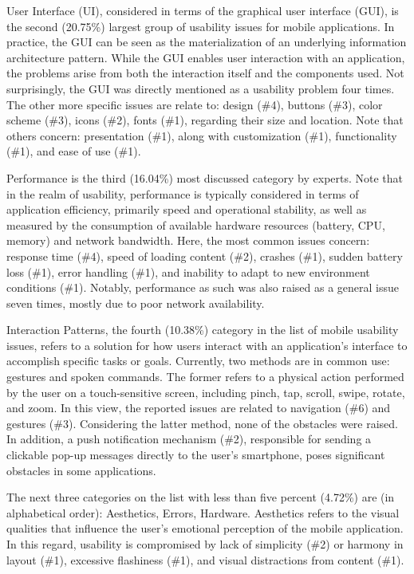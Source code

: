 \documentclass[preprint,12pt,number]{elsarticle}
\begin{document}
User Interface (UI), considered in terms of the graphical user interface (GUI), is the second (20.75\%) largest group of usability issues for mobile applications. In practice, the GUI can be seen as the materialization of an underlying information architecture pattern. While the GUI enables user interaction with an application, the problems arise from both the interaction itself and the components used. 
Not surprisingly, the GUI was directly mentioned as a usability problem four times. The other more specific issues are relate to: design (\#4), buttons (\#3), color scheme (\#3), icons (\#2), fonts (\#1), regarding their size and location. Note that others concern: presentation (\#1), along with customization (\#1), functionality (\#1), and ease of use (\#1).

Performance is the third (16.04\%) most discussed category by experts. Note that in the realm of usability, performance is typically considered in terms of application efficiency, primarily speed and operational stability, as well as measured by the consumption of available hardware resources (battery, CPU, memory) and network bandwidth. 
Here, the most common issues concern: response time (\#4), speed of loading content (\#2), crashes (\#1), 
sudden battery loss (\#1), error handling (\#1), and inability to adapt to new environment conditions (\#1). 
Notably, performance as such was also raised as a general issue seven times, mostly due to poor network availability. 

Interaction Patterns, the fourth (10.38\%) category in the list of mobile usability issues, refers to a solution for how users interact with an application's interface to accomplish specific tasks or goals. Currently, two methods are in common use: gestures and spoken commands. The former refers to a physical action performed by the user on a touch-sensitive screen, including pinch, tap, scroll, swipe, rotate, and zoom.
In this view, the reported issues are related to navigation (\#6) and gestures (\#3). Considering the latter method, none of the obstacles were raised. In addition, a push notification mechanism (\#2), responsible for sending a clickable pop-up messages directly to the user's smartphone, poses significant obstacles in some applications. 

The next three categories on the list with less than five percent (4.72\%) are (in alphabetical order): Aesthetics, Errors, Hardware.
Aesthetics refers to the visual qualities that influence the user's emotional perception of the mobile application. In this regard, usability is compromised by lack of simplicity (\#2) or harmony in layout (\#1), excessive flashiness (\#1), and visual distractions from content (\#1).
\end{document}
